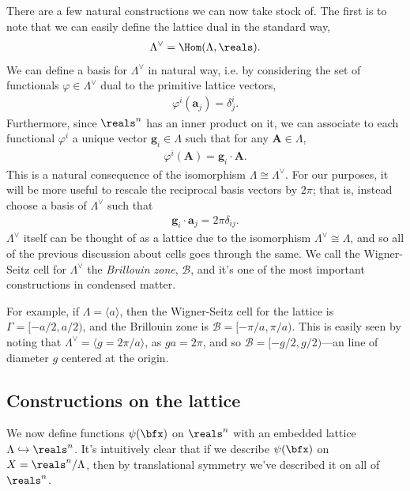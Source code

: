 \documentclass[11pt]{article}
\begin{document}
There are a few natural constructions we can now take stock of. 
The first is to note that we can easily define the lattice dual in the standard way,
\begin{align*}
    \Lambda^\vee = \Hom(\Lambda, \reals).
\end{align*}
We can define a basis for $\Lambda^\vee$ in natural way,
i.e. by considering the set of functionals $\varphi \in \Lambda^\vee$
dual to the primitive lattice vectors,
\begin{align*}
    \varphi^i(\mathbf{a}_j) = \delta^i_j.
\end{align*}
Furthermore, since $\reals^n$ has an inner product on it, we
can associate to each functional $\varphi^i$ a unique vector $\mathbf{g}_i \in \Lambda$
such that for any $\mathbf{A} \in \Lambda$,
\begin{align*}
    \varphi^i(\mathbf{A}) = \mathbf{g}_i \cdot \mathbf{A}.
\end{align*}
This is a natural consequence of the isomorphism $\Lambda \cong \Lambda^\vee$.
For our purposes, it will be more useful to rescale the reciprocal
basis vectors by $2\pi$; that is, instead choose a basis of $\Lambda^\vee$
such that
\begin{align*}
    \mathbf{g}_i \cdot \mathbf{a}_j = 2\pi \delta_{ij}.
\end{align*}
$\Lambda^\vee$ itself can be thought of as a lattice due to the isomorphism
$\Lambda^\vee \cong \Lambda$, and so all of the previous discussion about
cells goes through the same. We call the Wigner-Seitz cell for $\Lambda^\vee$
the \emph{Brillouin zone}, $\mathcal{B}$, and it's one of the most important constructions
in condensed matter. 

For example, if $\Lambda = \langle a \rangle$, then the Wigner-Seitz cell for
the lattice is $\Gamma = [-a/2, a/2)$, and the Brillouin zone is $\mathcal{B} = [-\pi/a, \pi/a)$.
This is easily seen by noting that $\Lambda^\vee = \langle g = 2\pi/a \rangle$,
as $g a = 2\pi$, and so $\mathcal{B} = [-g/2, g/2)$---an line of diameter $g$
centered at the origin.



\subsection{Constructions on the lattice}

We now define functions $\psi(\bfx)$ on $\reals^n$ with an embedded lattice
$\Lambda \hookrightarrow \reals^n$. It's intuitively clear that
if we describe $\psi(\bfx)$ on $X = \reals^n/\Lambda$, then by
translational symmetry we've described it on all of $\reals^n$.
\end{document}
